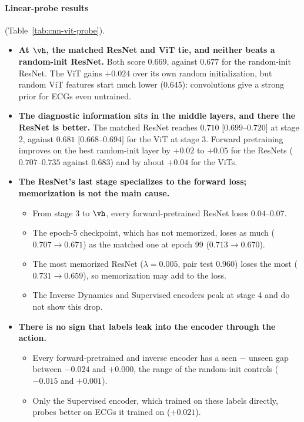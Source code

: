 \paragraph{Linear-probe results} (Table~\ref{tab:cnn-vit-probe}).
\begin{itemize}
\item \textbf{At $\vh$, the matched ResNet and ViT tie, and neither beats a random-init ResNet.} Both score $0.669$, against $0.677$ for the random-init ResNet. The ViT gains $+0.024$ over its own random initialization, but random ViT features start much lower ($0.645$): convolutions give a strong prior for ECGs even untrained.
\item \textbf{The diagnostic information sits in the middle layers, and there the ResNet is better.} The matched ResNet reaches $0.710$ $[0.699$--$0.720]$ at stage 2, against $0.681$ $[0.668$--$0.694]$ for the ViT at stage 3. Forward pretraining improves on the best random-init layer by $+0.02$ to $+0.05$ for the ResNets ($0.707$--$0.735$ against $0.683$) and by about $+0.04$ for the ViTs.
\item \textbf{The ResNet's last stage specializes to the forward loss; memorization is not the main cause.}
  \begin{itemize}
  \item From stage 3 to $\vh$, every forward-pretrained ResNet loses $0.04$--$0.07$.
  \item The epoch-5 checkpoint, which has not memorized, loses as much ($0.707\to0.671$) as the matched one at epoch 99 ($0.713\to0.670$).
  \item The most memorized ResNet ($\lambda=0.005$, pair test $0.960$) loses the most ($0.731\to0.659$), so memorization may add to the loss.
  \item The Inverse Dynamics and Supervised encoders peak at stage 4 and do not show this drop.
  \end{itemize}
\item \textbf{There is no sign that labels leak into the encoder through the action.}
  \begin{itemize}
  \item Every forward-pretrained and inverse encoder has a seen $-$ unseen gap between $-0.024$ and $+0.000$, the range of the random-init controls ($-0.015$ and $+0.001$).
  \item Only the Supervised encoder, which trained on these labels directly, probes better on ECGs it trained on ($+0.021$).
  \end{itemize}
\end{itemize}

